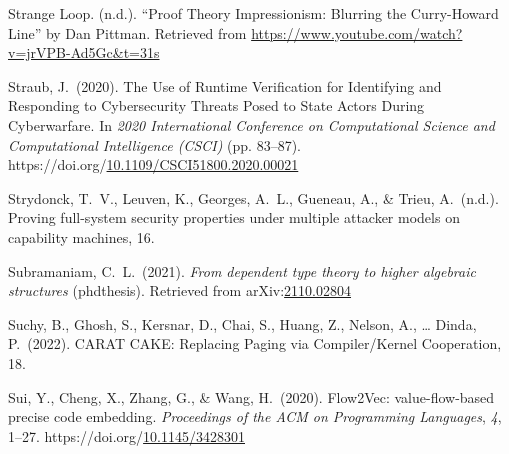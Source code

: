 \documentclass[12pt,twoside]{article}
\begin{document}
{\begin{thebibliography}{1079}
\mdbibitemlabel{}Strange Loop. (n.d.). \textquotedblleft{}Proof Theory Impressionism: Blurring the Curry-Howard Line\textquotedblright{} by Dan Pittman. Retrieved from \href{https://www.youtube.com/watch?v=jrVPB-Ad5Gc\%26t=31s}{{\ttfamily https://\hspace{0pt}www.\hspace{0pt}youtube.\hspace{0pt}com/\hspace{0pt}watch?\hspace{0pt}v=\hspace{0pt}jrVPB-\hspace{0pt}Ad5Gc\&\hspace{0pt}t=\hspace{0pt}31s}}%

\mdbibitemlabel{}Straub, J.~(2020). The Use of Runtime Verification for Identifying and Responding to Cybersecurity Threats Posed to State Actors During Cyberwarfare. In \emph{2020 International Conference on Computational Science and Computational Intelligence (CSCI)} (pp. 83–87). https://doi.org/\href{https://dx.doi.org/10.1109/CSCI51800.2020.00021}{10.1109/CSCI51800.2020.00021}%

\mdbibitemlabel{}Strydonck, T.~V., Leuven, K., Georges, A.~L., Gueneau, A., \& Trieu, A.~(n.d.). Proving full-system security properties under multiple attacker models on capability machines, 16.%

\mdbibitemlabel{}Subramaniam, C.~L.~(2021). \emph{From dependent type theory to higher algebraic structures} (phdthesis). Retrieved from arXiv:\href{http://arxiv.org/abs/2110.02804}{2110.02804}%

\mdbibitemlabel{}Suchy, B., Ghosh, S., Kersnar, D., Chai, S., Huang, Z., Nelson, A., … Dinda, P.~(2022). CARAT CAKE: Replacing Paging via Compiler/Kernel Cooperation, 18.%

\mdbibitemlabel{}Sui, Y., Cheng, X., Zhang, G., \& Wang, H.~(2020). Flow2Vec: value-flow-based precise code embedding. \emph{Proceedings of the ACM on Programming Languages}, \emph{4}, 1–27. https://doi.org/\href{https://dx.doi.org/10.1145/3428301}{10.1145/3428301}%


\end{thebibliography}}
\end{document}
